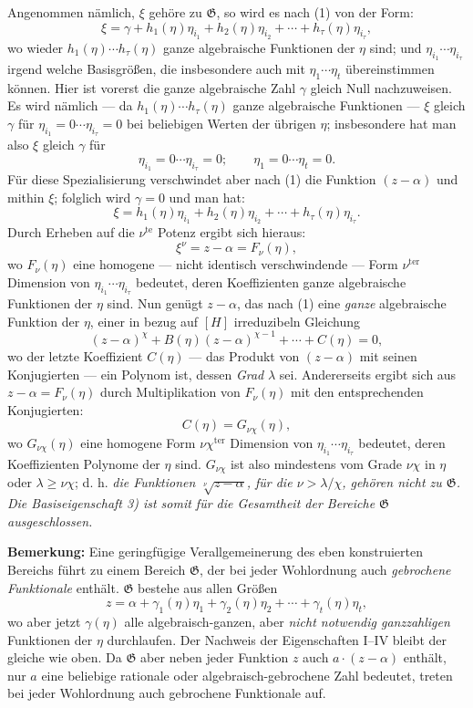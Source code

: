 \documentclass[11pt]{article}
\begin{document}
Angenommen nämlich, $\xi$ gehöre zu $\mathfrak G$, so wird es nach (1) von der
Form:
\[
 \xi=\gamma+h_1(\eta)\eta_{i_1}+h_2(\eta)\eta_{i_2}
      +\cdots+h_\tau(\eta)\eta_{i_\tau},
\]
wo wieder $h_1(\eta)\cdots h_\tau(\eta)$ ganze algebraische Funktionen der
$\eta$ sind; und $\eta_{i_1}\cdots\eta_{i_\tau}$ irgend welche Basisgrößen, die
insbesondere auch mit $\eta_1\cdots\eta_t$ übereinstimmen können. Hier ist
vorerst die ganze algebraische Zahl $\gamma$ gleich Null nachzuweisen. Es wird
nämlich --- da $h_1(\eta)\cdots h_\tau(\eta)$ ganze algebraische Funktionen ---
$\xi$ gleich $\gamma$ für
$\eta_{i_1}=0\cdots\eta_{i_\tau}=0$ bei beliebigen Werten der übrigen $\eta$;
insbesondere hat man also $\xi$ gleich $\gamma$ für
\[
 \eta_{i_1}=0\cdots \eta_{i_\tau}=0; \qquad
 \eta_1=0\cdots \eta_t=0.
\]
Für diese Spezialisierung verschwindet aber nach (1) die Funktion $(z-\alpha)$
und mithin $\xi$; folglich wird $\gamma=0$ und man hat:
\[
 \xi=h_1(\eta)\eta_{i_1}+h_2(\eta)\eta_{i_2}
      +\cdots+h_\tau(\eta)\eta_{i_\tau}.
\]
Durch Erheben auf die $\nu^{\text{te}}$ Potenz ergibt sich hieraus:
\[
 \xi^\nu=z-\alpha=F_\nu(\eta),
\]
wo $F_\nu(\eta)$ eine homogene --- nicht identisch verschwindende --- Form
$\nu^{\text{ter}}$ Dimension von $\eta_{i_1}\cdots\eta_{i_\tau}$ bedeutet, deren
Koeffizienten ganze algebraische Funktionen der $\eta$ sind. Nun genügt
$z-\alpha$, das nach (1) eine \emph{ganze} algebraische Funktion der $\eta$,
einer in bezug auf $[H]$ irreduzibeln Gleichung
\[
 (z-\alpha)^\chi+B(\eta)(z-\alpha)^{\chi-1}+\cdots+C(\eta)=0,
\]
wo der letzte Koeffizient $C(\eta)$ --- das Produkt von $(z-\alpha)$ mit seinen
Konjugierten --- ein Polynom ist, dessen \emph{Grad} $\lambda$ sei. Andererseits
ergibt sich aus $z-\alpha=F_\nu(\eta)$ durch Multiplikation von $F_\nu(\eta)$
mit den entsprechenden Konjugierten:
\[
 C(\eta)=G_{\nu\chi}(\eta),
\]
wo $G_{\nu\chi}(\eta)$ eine homogene Form $\nu\chi^{\text{ter}}$ Dimension von
$\eta_{i_1}\cdots\eta_{i_\tau}$ bedeutet, deren Koeffizienten Polynome der
$\eta$ sind. $G_{\nu\chi}$ ist also mindestens vom Grade $\nu\chi$ in $\eta$
oder $\lambda\geq\nu\chi$; d. h. \emph{die Funktionen
$\sqrt[\nu]{z-\alpha}$, für die $\nu>\lambda/\chi$, gehören nicht zu
$\mathfrak G$. Die Basiseigenschaft 3) ist somit für die Gesamtheit der
Bereiche $\mathfrak G$ ausgeschlossen.}

\textbf{Bemerkung:} Eine geringfügige Verallgemeinerung des eben konstruierten
Bereichs führt zu einem Bereich $\mathfrak G$, der bei jeder Wohlordnung auch
\emph{gebrochene Funktionale} enthält. $\mathfrak G$ bestehe aus allen Größen
\[
 z=\alpha+\gamma_1(\eta)\eta_1+\gamma_2(\eta)\eta_2
      +\cdots+\gamma_t(\eta)\eta_t,
\]
wo aber jetzt $\gamma(\eta)$ alle algebraisch-ganzen, aber \emph{nicht
notwendig ganzzahligen} Funktionen der $\eta$ durchlaufen. Der Nachweis der
Eigenschaften I--IV bleibt der gleiche wie oben. Da $\mathfrak G$ aber neben
jeder Funktion $z$ auch $a\cdot(z-\alpha)$ enthält, nur $a$ eine beliebige
rationale oder algebraisch-gebrochene Zahl bedeutet, treten bei jeder Wohlordnung
auch gebrochene Funktionale auf.
\end{document}
